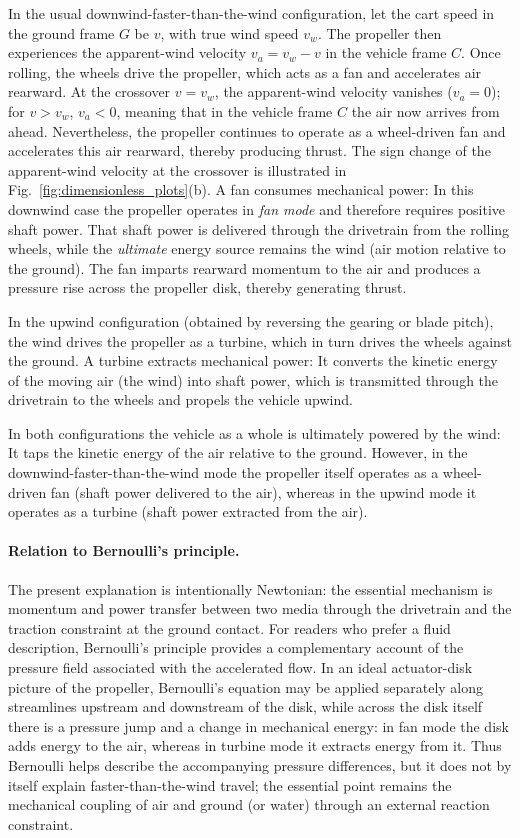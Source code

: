 \documentclass[a4paper]{article}
\begin{document}
In the usual downwind-faster-than-the-wind configuration, let the cart speed in
the ground frame \(G\) be \(v\), with true wind speed \(v_w\). The propeller
then experiences the apparent-wind velocity \(v_a=v_w-v\) in the vehicle frame
\(C\). Once rolling, the wheels drive the propeller, which acts as a fan and
accelerates air rearward. At the crossover \(v=v_w\), the apparent-wind
velocity vanishes (\(v_a=0\)); for \(v>v_w\), \(v_a<0\),
meaning that in the vehicle frame \(C\) the air now arrives from ahead.
Nevertheless, the propeller
continues to operate as a
wheel-driven fan and accelerates this air rearward,
thereby producing thrust. The sign change of the apparent-wind velocity at the
crossover is illustrated in Fig.~\ref{fig:dimensionless_plots}(b).
A fan consumes mechanical power: In this downwind case the propeller operates in
\emph{fan mode} and therefore requires positive shaft power. That shaft power is
delivered through the drivetrain from the rolling wheels, while the \emph{ultimate}
energy source remains the wind (air motion relative to the ground). The fan
imparts rearward momentum to the air and produces a pressure rise across the
propeller disk, thereby generating thrust.

In the upwind configuration (obtained by reversing the gearing or blade pitch),
the wind drives the propeller as a turbine, which in turn drives the wheels
against the ground. A turbine extracts mechanical power: It converts the kinetic
energy of the moving air (the wind) into shaft power, which is transmitted
through the drivetrain to the wheels and propels the vehicle upwind.

In both configurations the vehicle as a whole is ultimately powered by the wind:
It taps the kinetic energy of the air relative to the ground. However, in the
downwind-faster-than-the-wind mode the propeller itself operates as a
wheel-driven fan (shaft power delivered to the air), whereas in the upwind mode
it operates as a turbine (shaft power extracted from the air).

\paragraph*{Relation to Bernoulli's principle.}
The present explanation is intentionally Newtonian: the essential mechanism is
momentum and power transfer between two media through the drivetrain and the
traction constraint at the ground contact. For readers who prefer a fluid
description, Bernoulli's principle provides a complementary account of the
pressure field associated with the accelerated flow. In an ideal actuator-disk
picture of the propeller, Bernoulli's equation may be applied separately along
streamlines upstream and downstream of the disk, while across the disk itself
there is a pressure jump and a change in mechanical energy: in fan mode the
disk adds energy to the air, whereas in turbine mode it extracts energy from
it. Thus Bernoulli helps describe the accompanying pressure differences, but it
does not by itself explain faster-than-the-wind travel; the essential point
remains the mechanical coupling of air and ground (or water) through an
external reaction constraint.
\end{document}

